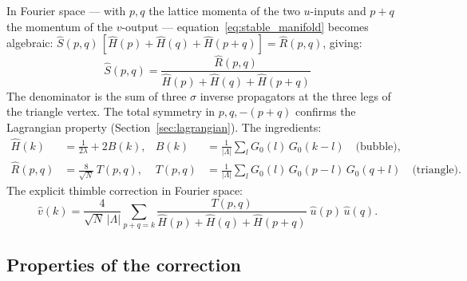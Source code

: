 \documentclass[12pt]{article}
\theoremstyle{definition}
\theoremstyle{remark}
\newcommand{\La}{\Lambda}
\begin{document}
In Fourier space --- with $p, q$ the lattice momenta of the
two $u$-inputs and $p{+}q$ the momentum of the $v$-output ---
equation~\eqref{eq:stable_manifold} becomes algebraic:
$\hat{S}(p,q)\,[\hat{H}(p) + \hat{H}(q) + \hat{H}(p{+}q)]
= \hat{R}(p,q)$, giving:
\begin{equation}\label{eq:S_fourier}
  \boxed{\hat{S}(p,q) = \frac{\hat{R}(p,q)}
    {\hat{H}(p) + \hat{H}(q) + \hat{H}(p+q)}}
\end{equation}
The denominator is the sum of three $\sigma$ inverse
propagators at the three legs of the triangle vertex.
The total symmetry in $p, q, -(p{+}q)$ confirms the Lagrangian
property (Section~\ref{sec:lagrangian}). The ingredients:
\begin{align}
  \hat{H}(k) &= \frac{1}{2\lambda} + 2B(k),
    &B(k) &= \frac{1}{|\La|}\sum_l G_0(l)\,G_0(k{-}l)
    \quad\text{(bubble)}, \\
  \hat{R}(p,q) &= \frac{8}{\sqrt{N}}\,T(p,q),
    &T(p,q) &= \frac{1}{|\La|}\sum_l G_0(l)\,G_0(p{-}l)\,G_0(q{+}l)
    \quad\text{(triangle)}.
\end{align}
The explicit thimble correction in Fourier space:
\begin{equation}\label{eq:thimble_1N}
  \hat{v}(k) = \frac{4}{\sqrt{N}\,|\La|}
    \sum_{p+q=k}
    \frac{T(p,q)}{\hat{H}(p)+\hat{H}(q)+\hat{H}(p{+}q)}\;
    \hat{u}(p)\,\hat{u}(q).
\end{equation}

\subsection{Properties of the correction}
\end{document}
